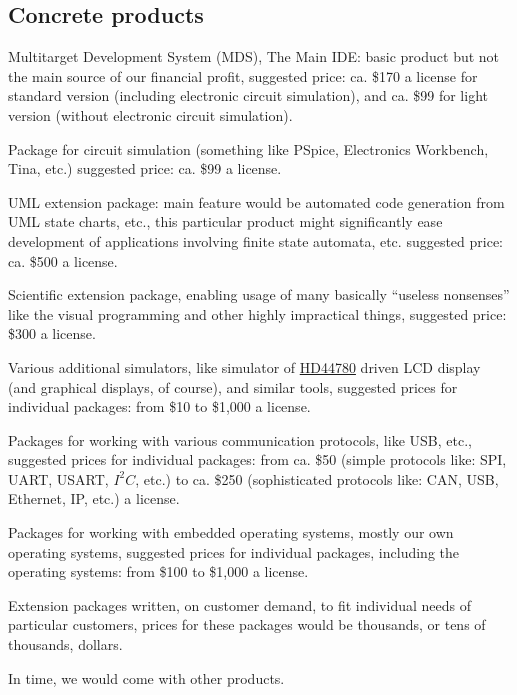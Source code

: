 \documentclass[a4paper,twoside,15pt]{book}
\begin{document}
		\subsection{Concrete products}
			\begin{dinglist}{73}
				\item Multitarget Development System (MDS), The Main IDE: basic product but not the main source of our financial profit, suggested price: ca. \$170 a license for standard version (including electronic circuit simulation), and ca. \$99 for light version (without electronic circuit simulation).
				\item Package for circuit simulation (something like PSpice, Electronics Workbench, Tina, etc.) suggested price: ca. \$99 a license.
				\item UML extension package: main feature would be automated code generation from UML state charts, etc., this particular product might significantly ease development of applications involving finite state automata, etc. suggested price: ca. \$500 a license.
				\item Scientific extension package, enabling usage of many basically ``useless nonsenses'' like the visual programming and other highly impractical things, suggested price: \$300 a license.
				\item Various additional simulators, like simulator of \href{http://en.wikipedia.org/wiki/Hitachi_HD44780_LCD_controller}{HD44780} driven LCD display (and graphical displays, of course), and similar tools, suggested prices for individual packages: from \$10 to \$1,000 a license.
				\item Packages for working with various communication protocols, like USB, etc., suggested prices for individual packages: from ca. \$50 (simple protocols like: SPI, UART, USART, $I^2C$, etc.) to ca. \$250 (sophisticated protocols like: CAN, USB, Ethernet, IP, etc.) a license.
				\item Packages for working with embedded operating systems, mostly our own operating systems, suggested prices for individual packages, including the operating systems: from \$100 to \$1,000 a license.
				\item Extension packages written, on customer demand, to fit individual needs of particular customers, prices for these packages would be thousands, or tens of thousands, dollars.
				\item In time, we would come with other products.
			\end{dinglist}
\end{document}
